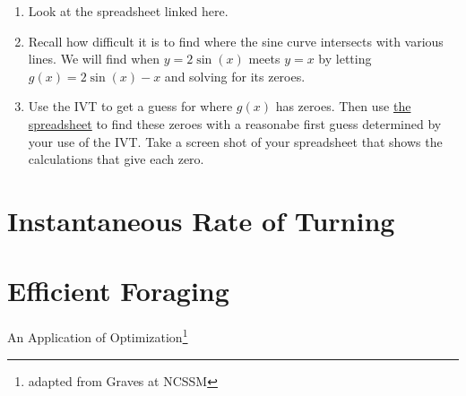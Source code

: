 \documentclass{amsbook}
\begin{document}
\begin{enumerate}
\begin{enumerate}
    			\item Look at the spreadsheet linked here. 
    			\item Recall how difficult it is to find where the sine curve intersects with various lines. We will find when $y=2\sin(x)$ meets $y=x$ by letting $g(x)=2\sin(x)-x$ and solving for its zeroes. 
    			\item Use the IVT to get a guess for where $g(x)$ has zeroes. Then use \href{https://docs.google.com/spreadsheets/d/1FWjEk4M7XneAE1M9-i5LCKr_XWMnP2WlhSxLDb_xmX8/edit?usp=sharing}{the spreadsheet} to find these zeroes with a reasonabe first guess determined by your use of the IVT. Take a screen shot of your spreadsheet that shows the calculations that give each zero.
    			
    		
    		\end{enumerate}
    	
    \end{enumerate}
    
\newpage	
    \section*{Instantaneous Rate of Turning}
    
    
\newpage	    
    \section*{Efficient Foraging}

\normalsize 
An Application of Optimization\footnote{adapted from Graves at NCSSM}
\\
\end{document}
